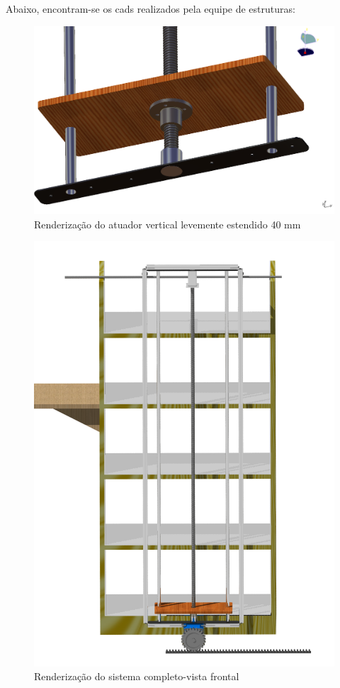 Abaixo, encontram-se os cads realizados pela equipe de estruturas:
\begin{figure}[!h]		
\centering 
\includegraphics[scale=0.4]{figuras/screen_2}
\caption{Renderização do atuador vertical levemente estendido 40 mm}
\label{Renderização do atuador vertical levemente estendido 40 mm}
\end{figure}
\FloatBarrier

\begin{figure}[!h]		
\centering
\includegraphics[scale=0.1]{figuras/render_frente}
\caption{Renderização do sistema completo-vista frontal}
\label{Renderização do sistema completo-vista frontal}
\end{figure}
\FloatBarrier


